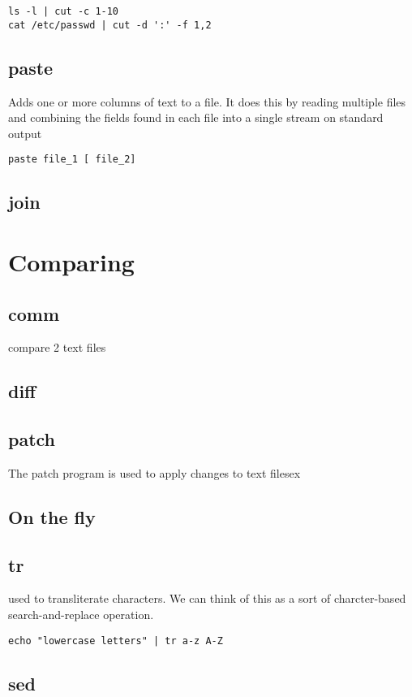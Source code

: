 \begin{verbatim}
ls -l | cut -c 1-10
cat /etc/passwd | cut -d ':' -f 1,2
\end{verbatim}



\subsection{paste}
Adds one or more columns of text to a file.
It does this by reading multiple
files and combining the fields found in each file into a single stream on standard output

\verb+paste file_1 [ file_2]+

\subsection{join}

\section{Comparing}

\subsection{comm}

compare 2 text files

\subsection{diff}
\subsection{patch}
The patch program is used to apply changes to text filesex

\subsection{On the fly}
\subsection{tr}
used to transliterate characters. We can think of this as a sort of
charcter-based search-and-replace operation.

\begin{verbatim}
echo "lowercase letters" | tr a-z A-Z
\end{verbatim}
\subsection{sed}

